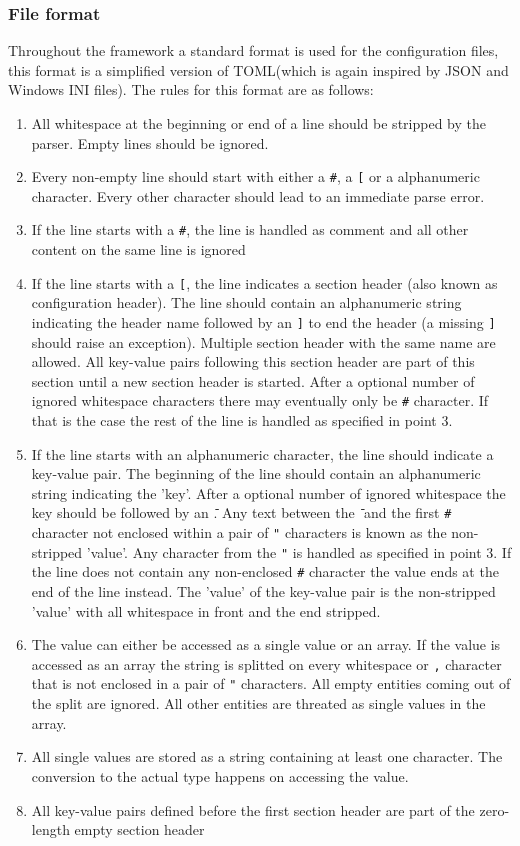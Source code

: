 \subsubsection{File format}
\label{sec:config_file_format}
Throughout the framework a standard format is used for the configuration files, this format is a simplified version of TOML\needref (which is again inspired by JSON and Windows INI files). The rules for this format are as follows:
\begin{enumerate}
\item All whitespace at the beginning or end of a line should be stripped by the parser. Empty lines should be ignored.
\item Every non-empty line should start with either a \texttt{\#}, a \texttt{[} or a alphanumeric character. Every other character should lead to an immediate parse error.
\item If the line starts with a \texttt{\#}, the line is handled as comment and all other content on the same line is ignored
\item If the line starts with a \texttt{[}, the line indicates a section header (also known as configuration header). The line should contain an alphanumeric string indicating the header name followed by an \texttt{]} to end the header (a missing \texttt{]} should raise an exception). Multiple section header with the same name are allowed. All key-value pairs following this section header are part of this section until a new section header is started. After a optional number of ignored whitespace characters there may eventually only be \texttt{\#} character. If that is the case the rest of the line is handled as specified in point 3.
\item If the line starts with an alphanumeric character, the line should indicate a key-value pair. The beginning of the line should contain an alphanumeric string indicating the 'key'. After a optional number of ignored whitespace the key should be followed by an \texttt{\=}. Any text between the \texttt{\=} and the first \texttt{\#} character not enclosed within a pair of \texttt{"} characters is known as the non-stripped 'value'. Any character from the \texttt{"} is handled as specified in point 3. If the line does not contain any non-enclosed \texttt{\#} character the value ends at the end of the line instead. The 'value' of the key-value pair is the non-stripped 'value' with all whitespace in front and the end stripped.
\item The value can either be accessed as a single value or an array. If the value is accessed as an array the string is splitted on every whitespace or \texttt{,} character that is not enclosed in a pair of \texttt{"} characters. All empty entities coming out of the split are ignored. All other entities are threated as single values in the array.
\item All single values are stored as a string containing at least one character. The conversion to the actual type happens on accessing the value.
\item All key-value pairs defined before the first section header are part of the zero-length empty section header
\end{enumerate}

